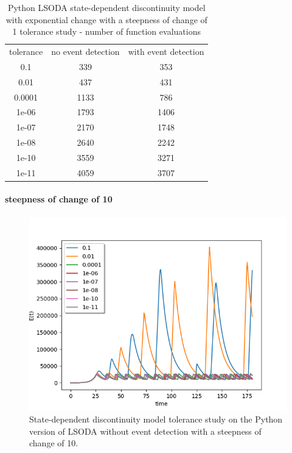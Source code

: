 \begin{table}[H]
\caption {Python LSODA state-dependent discontinuity model with exponential change with a steepness of change of 1 tolerance study - number of function evaluations} \label{tab:exp_state_tol_lsoda_1} 
\begin{center}
\begin{tabular}{ c c c }
tolerance & no event detection & with event detection \\ 
0.1 & 339 & 353 \\
0.01 & 437 & 431 \\
0.0001 & 1133 & 786 \\
1e-06 & 1793 & 1406 \\
1e-07 & 2170 & 1748 \\
1e-08 & 2640 & 2242 \\
1e-10 & 3559 & 3271 \\
1e-11 & 4059 & 3707 \\
\end{tabular}
\end{center}
\end{table}



\paragraph{steepness of change of 10}
\begin{figure}[H]
\centering
\includegraphics[width=0.7\linewidth]{./figures/exp_state_tol_lsoda_no_event_10}
\caption{State-dependent discontinuity model tolerance study on the Python version of LSODA without event detection with a steepness of change of 10.}
\label{fig:exp_state_tol_lsoda_no_event_10}
\end{figure}

